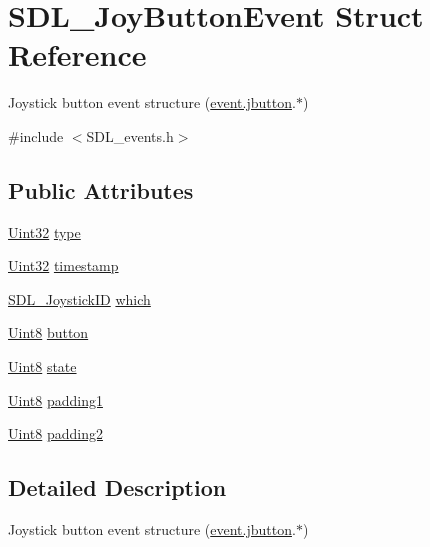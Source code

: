 \hypertarget{struct_s_d_l___joy_button_event}{}\section{S\+D\+L\+\_\+\+Joy\+Button\+Event Struct Reference}
\label{struct_s_d_l___joy_button_event}


Joystick button event structure (\hyperlink{union_s_d_l___event_a591104d64903ae1cf70874fb5d3124ff}{event.\+jbutton}.$\ast$)  




{\ttfamily \#include $<$S\+D\+L\+\_\+events.\+h$>$}

\subsection*{Public Attributes}
\begin{DoxyCompactItemize}
\item 
\hyperlink{_s_d_l__stdinc_8h_add440eff171ea5f55cb00c4a9ab8672d}{Uint32} \hyperlink{struct_s_d_l___joy_button_event_a8f3312a046d37fa2884b93f69c4cb655}{type}
\item 
\hyperlink{_s_d_l__stdinc_8h_add440eff171ea5f55cb00c4a9ab8672d}{Uint32} \hyperlink{struct_s_d_l___joy_button_event_ab50b6f7d1ab3ac53df69fc2d6cf5fa2a}{timestamp}
\item 
\hyperlink{_s_d_l__joystick_8h_a3c3d32500cb08f76ee8077983912c0bd}{S\+D\+L\+\_\+\+Joystick\+ID} \hyperlink{struct_s_d_l___joy_button_event_a1679049adad7242b28420948fdc79044}{which}
\item 
\hyperlink{_s_d_l__stdinc_8h_a2944638813a090aa23e62f4da842c3e2}{Uint8} \hyperlink{struct_s_d_l___joy_button_event_a73ebe4261cf80564052af9c1af737a4d}{button}
\item 
\hyperlink{_s_d_l__stdinc_8h_a2944638813a090aa23e62f4da842c3e2}{Uint8} \hyperlink{struct_s_d_l___joy_button_event_ad3b6f8d9aa2c5e694f664b97d12bcd2b}{state}
\item 
\hyperlink{_s_d_l__stdinc_8h_a2944638813a090aa23e62f4da842c3e2}{Uint8} \hyperlink{struct_s_d_l___joy_button_event_a3e7ca473fb7783d755d64598529b1ff9}{padding1}
\item 
\hyperlink{_s_d_l__stdinc_8h_a2944638813a090aa23e62f4da842c3e2}{Uint8} \hyperlink{struct_s_d_l___joy_button_event_a77a78bee38f4bf0682ccd97bbf8f9ab9}{padding2}
\end{DoxyCompactItemize}


\subsection{Detailed Description}
Joystick button event structure (\hyperlink{union_s_d_l___event_a591104d64903ae1cf70874fb5d3124ff}{event.\+jbutton}.$\ast$) 

